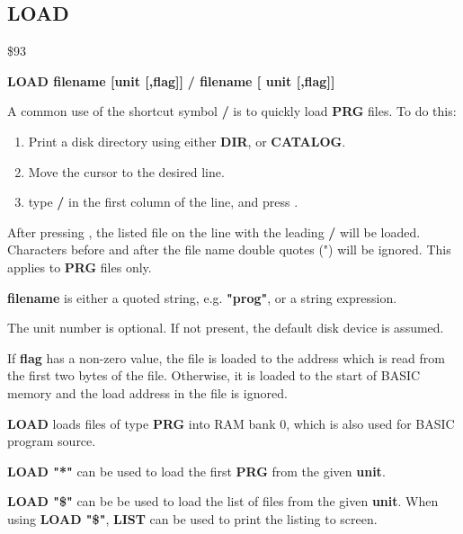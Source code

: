 
\newpage
\subsection{LOAD}
\begin{description}[leftmargin=2cm,style=nextline]
\item [Token:] \$93
\item [Format:] {\bf LOAD filename [unit [,flag]]}
                {\bf / filename [ unit [,flag]]}
\item [Usage:]

   A common use of the shortcut symbol {\bf /} is to quickly load
   {\bf PRG} files. To do this:

    \begin{enumerate}
    \item Print a disk directory using either {\bf DIR}, or {\bf CATALOG}.
    \item Move the cursor to the desired line.
    \item type {\bf /} in the first column of the line, and press .
    \end{enumerate}
   After pressing , the listed file on the line with the leading {\bf /} will be loaded.
Characters before and after the file name double quotes (") will be ignored.
   This applies to {\bf PRG} files only.

   {\bf filename} is either a quoted string, e.g. {\bf "prog"}, or
   a string expression.

   The unit number is optional.
   If not present, the default disk device is assumed.

   If {\bf flag} has a non-zero value, the file is loaded to
   the address which is read from the first two bytes of the file.
   Otherwise, it is loaded to the start of BASIC memory and
   the load address in the file is ignored.

\item [Remarks:]
   {\bf LOAD} loads files of type {\bf PRG} into RAM bank 0,
   which is also used for BASIC program source.

   {\bf LOAD "*"} can be used to load the first {\bf PRG} from the
   given {\bf unit}.

   {\bf LOAD "\$"} can be be used to load
   the list of files from the given {\bf unit}. When using {\bf LOAD "\$"},
   {\bf LIST} can be used to print the listing to screen.


\end{description}
